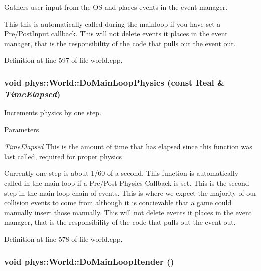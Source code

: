 Gathers user input from the OS and places events in the event manager. 

This this is automatically called during the mainloop if you have set a Pre/PostInput callback. This will not delete events it places in the event manager, that is the responsibility of the code that pulls out the event out. 

Definition at line 597 of file world.cpp.

\hypertarget{classphys_1_1World_a4596a7bd1dc49c3b45b5562fcd0d08f2}{
\subsubsection[{DoMainLoopPhysics}]{\setlength{\rightskip}{0pt plus 5cm}void phys::World::DoMainLoopPhysics (const {\bf Real} \& {\em TimeElapsed})}}
\label{da/ddf/classphys_1_1World_a4596a7bd1dc49c3b45b5562fcd0d08f2}


Increments physics by one step. 


\begin{DoxyParams}{Parameters}
\item[{\em TimeElapsed}]This is the amount of time that has elapsed since this function was last called, required for proper physics\end{DoxyParams}
Currently one step is about 1/60 of a second. This function is automatically called in the main loop if a Pre/Post-\/Physics Callback is set. This is the second step in the main loop chain of events. This is where we expect the majority of our collision events to come from although it is concievable that a game could manually insert those manually. This will not delete events it places in the event manager, that is the responsibility of the code that pulls out the event out. 

Definition at line 578 of file world.cpp.

\hypertarget{classphys_1_1World_a34133dd084f575a51209458dbe9ecdac}{
\subsubsection[{DoMainLoopRender}]{\setlength{\rightskip}{0pt plus 5cm}void phys::World::DoMainLoopRender ()}}
\label{da/ddf/classphys_1_1World_a34133dd084f575a51209458dbe9ecdac}


